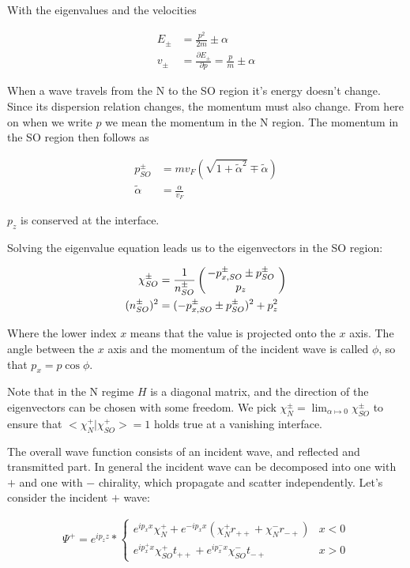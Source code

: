 \documentclass[11pt]{article}
\newcommand{\inp}[1]{\ensuremath{\left(#1\right)}}
\newcommand{\vect}[2]{\ensuremath{\inp{\hspace{-.8ex}\begin{array}{c}#1\\#2\end{array}\hspace{-.4ex}}}}
\newcommand{\ta}{\tilde \alpha}
\begin{document}
With the eigenvalues and the velocities

\begin{align}
    E_{\pm} &= \frac{p^2}{2m} \pm \alpha \\
    v_{\pm} &= \frac{\partial E_{\pm}}{\partial p} = \frac{p}{m} \pm \alpha
\end{align}

When a wave travels from the N to the SO region it's energy doesn't
change. Since its dispersion relation changes, the momentum must also
change. From here on when we write $p$ we mean the momentum in the N
region. The momentum in the SO region then follows as

\begin{align}
    \label{eq:pso}
    p_{SO}^{\pm} &= m v_F (\sqrt{1 + \ta^2} \mp \tilde \alpha) \\
    \tilde\alpha &= \frac{\alpha}{v_F}
\end{align}

$p_z$ is conserved at the interface.

Solving the eigenvalue equation leads us to the eigenvectors in the SO
region:

\begin{align*}
   \chi_{SO}^{\pm} &= \frac{1}{n_{SO}^{\pm}} 
                      \vect{-p_{x,SO}^{\pm} \pm p_{SO}^\pm}{p_z} \\
    (n_{SO}^{\pm})^2 &= (-p_{x,SO}^{\pm} \pm p_{SO}^\pm)^2 + p_z^2
\end{align*}

Where the lower index $x$ means that the value is projected onto the
$x$ axis. The angle between the $x$ axis and the momentum of the
incident wave is called $\phi$, so that $p_x = p \cos \phi$.

Note that in the N regime $H$ is a diagonal matrix, and the direction
of the eigenvectors can be chosen with some freedom. We pick
$\chi_N^{\pm} = \lim_{\alpha \mapsto 0} \chi_{SO}^{\pm}$ to ensure that
$<\chi_N^+|\chi_{SO}^+> = 1$ holds true at a vanishing interface.



The overall wave function consists of an incident wave, 
and reflected and transmitted part. In general the incident wave can
be decomposed into one with $+$ and one with $-$ chirality, which
propagate and scatter independently. Let's consider the incident $+$
wave:

\begin{align}
    \Psi^+ = e^{i p_z z} * \left\{
        \begin{array}{ll}
            e^{i p_x x} \chi_N^+ + e^{- i p_x x} (\chi_N^+ r_{++} +
                    \chi_N^- r_{-+})    & x < 0\\
            e^{i p_x^+ x} \chi_{SO}^+ t_{++} + e^{i p_x^- x}
            \chi_{SO}^- t_{-+}          & x > 0
        \end{array} \right.
\end{align}
\end{document}
